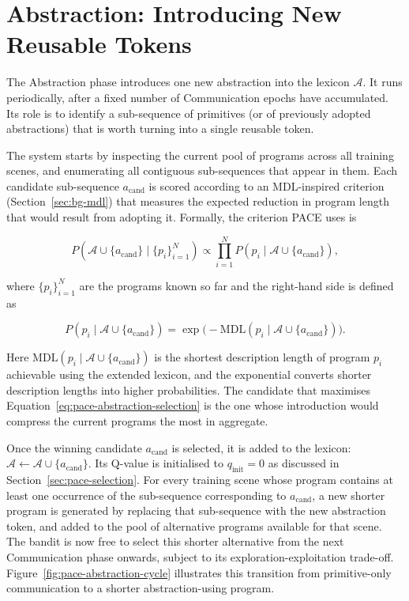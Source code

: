 \section{Abstraction: Introducing New Reusable Tokens}
\label{sec:pace-abstraction}

The Abstraction phase introduces one new abstraction into the lexicon $\mathcal{A}$. It runs periodically, after a fixed number of Communication epochs have accumulated. Its role is to identify a sub-sequence of primitives (or of previously adopted abstractions) that is worth turning into a single reusable token.

The system starts by inspecting the current pool of programs across all training scenes, and enumerating all contiguous sub-sequences that appear in them. Each candidate sub-sequence $a_{\text{cand}}$ is scored according to an MDL-inspired criterion (Section~\ref{sec:bg-mdl}) that measures the expected reduction in program length that would result from adopting it. Formally, the criterion PACE uses is

\begin{equation}
    P(\mathcal{A} \cup \{a_{\text{cand}}\} \mid \{p_i\}_{i=1}^N) \propto \prod_{i=1}^N P(p_i \mid \mathcal{A} \cup \{a_{\text{cand}}\}),
    \label{eq:pace-abstraction-selection}
\end{equation}

where $\{p_i\}_{i=1}^N$ are the programs known so far and the right-hand side is defined as

\begin{equation}
    P(p_i \mid \mathcal{A} \cup \{a_{\text{cand}}\}) = \exp\bigl(-\text{MDL}(p_i \mid \mathcal{A} \cup \{a_{\text{cand}}\})\bigr).
    \label{eq:pace-mdl-def}
\end{equation}

Here $\text{MDL}(p_i \mid \mathcal{A} \cup \{a_{\text{cand}}\})$ is the shortest description length of program $p_i$ achievable using the extended lexicon, and the exponential converts shorter description lengths into higher probabilities. The candidate that maximises Equation~\ref{eq:pace-abstraction-selection} is the one whose introduction would compress the current programs the most in aggregate.

Once the winning candidate $a_{\text{cand}}$ is selected, it is added to the lexicon: $\mathcal{A} \leftarrow \mathcal{A} \cup \{a_{\text{cand}}\}$. Its Q-value is initialised to $q_{\text{init}} = 0$ as discussed in Section~\ref{sec:pace-selection}. For every training scene whose program contains at least one occurrence of the sub-sequence corresponding to $a_{\text{cand}}$, a new shorter program is generated by replacing that sub-sequence with the new abstraction token, and added to the pool of alternative programs available for that scene. The bandit is now free to select this shorter alternative from the next Communication phase onwards, subject to its exploration-exploitation trade-off. Figure~\ref{fig:pace-abstraction-cycle} illustrates this transition from primitive-only communication to a shorter abstraction-using program.

